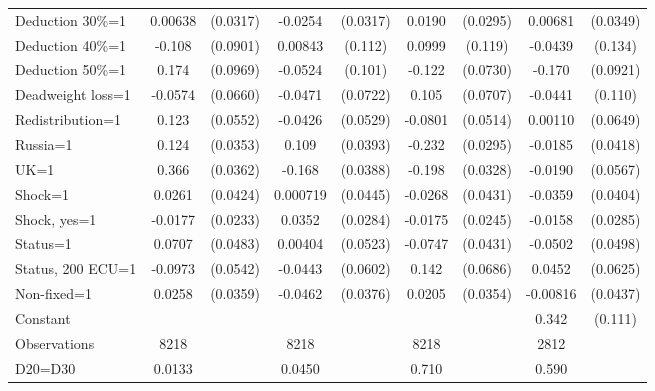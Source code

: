 \begin{tabular}{l|cccccc|cc}
Deduction 30\%=1&  0.00638         & (0.0317)&  -0.0254         & (0.0317)&   0.0190         & (0.0295)&  0.00681         & (0.0349)\\
Deduction 40\%=1&   -0.108         & (0.0901)&  0.00843         &  (0.112)&   0.0999         &  (0.119)&  -0.0439         &  (0.134)\\
Deduction 50\%=1&    0.174\sym{*}  & (0.0969)&  -0.0524         &  (0.101)&   -0.122\sym{*}  & (0.0730)&   -0.170\sym{*}  & (0.0921)\\
Deadweight loss=1&  -0.0574         & (0.0660)&  -0.0471         & (0.0722)&    0.105         & (0.0707)&  -0.0441         &  (0.110)\\
Redistribution=1&    0.123\sym{**} & (0.0552)&  -0.0426         & (0.0529)&  -0.0801         & (0.0514)&  0.00110         & (0.0649)\\
Russia=1        &    0.124\sym{***}& (0.0353)&    0.109\sym{***}& (0.0393)&   -0.232\sym{***}& (0.0295)&  -0.0185         & (0.0418)\\
UK=1            &    0.366\sym{***}& (0.0362)&   -0.168\sym{***}& (0.0388)&   -0.198\sym{***}& (0.0328)&  -0.0190         & (0.0567)\\
Shock=1         &   0.0261         & (0.0424)& 0.000719         & (0.0445)&  -0.0268         & (0.0431)&  -0.0359         & (0.0404)\\
Shock, yes=1    &  -0.0177         & (0.0233)&   0.0352         & (0.0284)&  -0.0175         & (0.0245)&  -0.0158         & (0.0285)\\
Status=1        &   0.0707         & (0.0483)&  0.00404         & (0.0523)&  -0.0747\sym{*}  & (0.0431)&  -0.0502         & (0.0498)\\
Status, 200 ECU=1&  -0.0973\sym{*}  & (0.0542)&  -0.0443         & (0.0602)&    0.142\sym{**} & (0.0686)&   0.0452         & (0.0625)\\
Non-fixed=1     &   0.0258         & (0.0359)&  -0.0462         & (0.0376)&   0.0205         & (0.0354)& -0.00816         & (0.0437)\\
Constant        &                  &         &                  &         &                  &         &    0.342\sym{***}&  (0.111)\\
\hline
Observations    &     8218         &         &     8218         &         &     8218         &         &     2812         &         \\
D20=D30         &   0.0133         &         &   0.0450         &         &    0.710         &         &    0.590         &         \\

\end{tabular}
